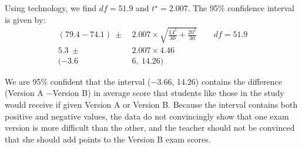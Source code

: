 \begin{examplewrap}
\begin{nexample}
\begin{description}
Using technology, we find $df=51.9$ and $t^{\star} = 2.007$.  The 95\% confidence interval is given by:
\begin{align*}
(79.4 - 74.1) \ \pm\  &2.007\times \sqrt{\frac{14^2}{30} + \frac{20^2}{30}}   \qquad df = 51.9\\
5.3 \ \pm\  &2.007\times 4.46 \\
(-3.6&6,\ 14.26)
\end{align*}
\item[\inferencestep{Conclude}]  We are 95\% confident that the interval ($-$3.66, 14.26) contains the difference (Version A $-$Version B) in average score that students like those in the study would receive if given Version A or Version B.  Because the interval contains both positive and negative values, the data do not convincingly show that one exam version is more difficult than the other, and the teacher should not be convinced that she should add points to the Version B exam scores.

\end{description}
\end{nexample}
\end{examplewrap}


\D{\newpage}



